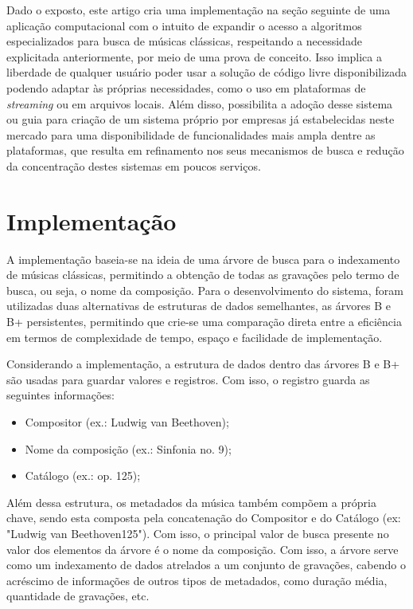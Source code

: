 \documentclass[12pt]{article}
\begin{document}
Dado o exposto, este artigo cria uma implementação na seção seguinte de uma aplicação
computacional com o intuito de expandir o acesso a algoritmos especializados para busca
de músicas clássicas, respeitando a necessidade explicitada anteriormente, por
meio de uma prova de conceito. Isso implica a liberdade de qualquer usuário
poder usar a solução de código livre disponibilizada podendo adaptar às próprias
necessidades, como o uso em plataformas de \emph{streaming} ou em arquivos
locais. Além disso, possibilita a adoção desse sistema ou guia para criação de um sistema
próprio por empresas já estabelecidas neste mercado
para uma disponibilidade de funcionalidades mais
ampla dentre as plataformas, que resulta em refinamento nos seus mecanismos de busca e redução
da concentração destes sistemas em poucos serviços.

\section{Implementação} \label{sec:implementation}

A implementação baseia-se na ideia de uma árvore de busca para o indexamento de
músicas clássicas, permitindo a obtenção de todas as gravações pelo termo de
busca, ou seja, o nome da composição. Para o desenvolvimento do sistema, foram
utilizadas duas alternativas de estruturas de dados semelhantes, as árvores B e
B\nolinebreak+ persistentes, permitindo que crie-se uma comparação direta entre
a eficiência em termos de complexidade de tempo, espaço e facilidade de
implementação.

Considerando a implementação, a estrutura de dados dentro das árvores B e
B\nolinebreak+ são usadas para guardar valores e registros. Com isso, o registro
guarda as seguintes informações:
\begin{itemize}
  \item Compositor (ex.: Ludwig van Beethoven);
  \item Nome da composição (ex.: Sinfonia no. 9);
  \item Catálogo (ex.: op. 125);
\end{itemize}

Além dessa estrutura, os metadados da música também compõem a própria chave,
sendo esta composta pela concatenação do Compositor e do Catálogo (ex:
"Ludwig van Beethoven125"). Com isso, o principal valor de busca presente no
valor dos elementos da árvore é o nome da composição. Com isso, a árvore serve
como um indexamento de dados atrelados a um conjunto de gravações, cabendo o
acréscimo de informações de outros tipos de metadados, como duração média,
quantidade de gravações, etc.
\end{document}
